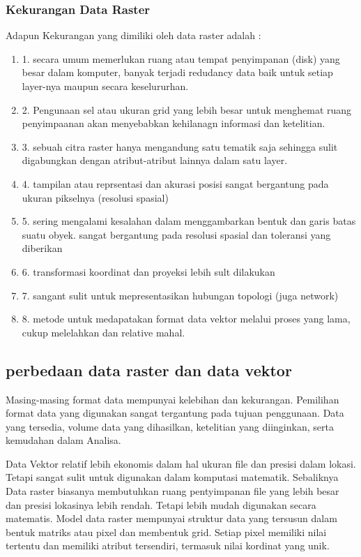 \subsubsection{Kekurangan Data Raster}
Adapun Kekurangan yang dimiliki oleh data raster adalah :
	\begin{enumerate}
		\item 1. secara umum memerlukan ruang atau tempat penyimpanan (disk) yang besar dalam komputer, banyak terjadi redudancy data baik untuk setiap layer-nya maupun secara keselururhan.
		\item 2. Pengunaan sel atau ukuran grid yang lebih besar untuk menghemat ruang penyimpaanan akan menyebabkan kehilanagn informasi dan ketelitian.
		\item 3. sebuah citra raster hanya mengandung satu tematik saja sehingga sulit digabungkan dengan atribut-atribut lainnya dalam satu layer.
		\item 4. tampilan atau reprsentasi dan akurasi posisi sangat bergantung pada ukuran pikselnya (resolusi spasial)
		\item 5. sering mengalami kesalahan dalam menggambarkan bentuk dan garis batas suatu obyek. sangat bergantung pada resolusi spasial dan toleransi yang diberikan
		\item 6. transformasi koordinat dan proyeksi lebih sult dilakukan
		\item 7. sangant sulit untuk mepresentasikan hubungan topologi (juga network)
		\item 8. metode untuk medapatakan format data vektor melalui proses yang lama, cukup melelahkan dan relative mahal.\cite{irwansyah2013sistem}
	\end{enumerate}

\subsection{perbedaan data raster dan data vektor}
Masing-masing format data mempunyai kelebihan dan kekurangan.
Pemilihan format data yang digunakan sangat tergantung pada tujuan penggunaan. 
Data yang tersedia, volume data yang dihasilkan, ketelitian yang diinginkan, serta kemudahan dalam Analisa.

Data Vektor relatif lebih ekonomis dalam hal ukuran file dan presisi dalam lokasi. Tetapi sangat sulit untuk 
digunakan dalam komputasi matematik.
Sebaliknya Data raster biasanya membutuhkan ruang pentyimpanan file yang lebih besar dan presisi lokasinya lebih rendah.
Tetapi lebih mudah digunakan secara matematis.
Model data raster mempunyai struktur data yang tersusun dalam bentuk matriks atau pixel dan membentuk grid. 
Setiap pixel memiliki nilai tertentu dan memiliki atribut tersendiri, termasuk nilai kordinat yang unik.

